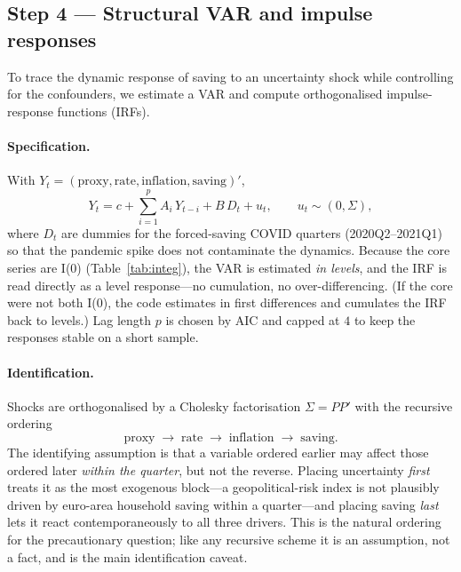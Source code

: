 \documentclass[11pt,a4paper]{article}
\begin{document}
\subsection{Step 4 --- Structural VAR and impulse responses}
To trace the dynamic response of saving to an uncertainty shock while
controlling for the confounders, we estimate a VAR and compute orthogonalised
impulse-response functions (IRFs).

\paragraph{Specification.} With $Y_t=(\text{proxy},\text{rate},\text{inflation},
\text{saving})'$,
\begin{equation}
  Y_t = c + \sum_{i=1}^{p} A_i\,Y_{t-i} + B\,D_t + u_t,
  \qquad u_t \sim (0,\Sigma),
\end{equation}
where $D_t$ are dummies for the forced-saving COVID quarters (2020Q2--2021Q1) so
that the pandemic spike does not contaminate the dynamics. Because the core
series are I(0) (Table~\ref{tab:integ}), the VAR is estimated \emph{in levels},
and the IRF is read directly as a level response---no cumulation, no
over-differencing. (If the core were not both I(0), the code estimates in first
differences and cumulates the IRF back to levels.) Lag length $p$ is chosen by
AIC and capped at $4$ to keep the responses stable on a short sample.

\paragraph{Identification.} Shocks are orthogonalised by a Cholesky
factorisation $\Sigma = PP'$ with the recursive ordering
\[
  \text{proxy} \;\to\; \text{rate} \;\to\; \text{inflation} \;\to\; \text{saving}.
\]
The identifying assumption is that a variable ordered earlier may affect those
ordered later \emph{within the quarter}, but not the reverse. Placing uncertainty
\emph{first} treats it as the most exogenous block---a geopolitical-risk index is
not plausibly driven by euro-area household saving within a quarter---and placing
saving \emph{last} lets it react contemporaneously to all three drivers. This is
the natural ordering for the precautionary question; like any recursive scheme it
is an assumption, not a fact, and is the main identification caveat.
\end{document}
